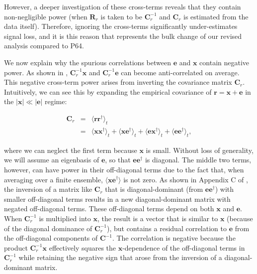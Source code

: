 \documentclass[preprint2,numberedappendix,tighten]{aastex6}  %
\begin{document}
However, a deeper investigation of these cross-terms reveals that they contain non-negligible power (when $\textbf{R}_{r}$
is taken to be $\textbf{C}_{r}^{-1}$ and $\textbf{C}_{r}$ is estimated from the data itself). Therefore, ignoring the cross-terms significantly under-estimates signal loss, and it is this reason that represents the bulk change of our revised analysis compared to P64. 

We now explain why the spurious correlations between $\textbf{e}$ and $\textbf{x}$ contain negative power.  As shown in \citet{switzer_et_al2015}, 
$\textbf{C}_{r}^{-1}\textbf{x}$ and
$\textbf{C}_{r}^{-1}\textbf{e}$
can become anti-correlated on average. 
This negative cross-term power arises from inverting the covariance matrix
$\textbf{C}_{r}$. 
Intuitively, we can see this by expanding the empirical covariance of $\textbf{r}=\textbf{x}+\textbf{e}$ in the
$|\textbf{x}|\ll|\textbf{e}|$ regime:

\begin{eqnarray}
\textbf{C}_{r} &=& \langle \textbf{rr}^{\dagger} \rangle_{t} \\
&=& \langle \textbf{xx}^{\dagger} \rangle_{t} + \langle \textbf{xe}^{\dagger} \rangle_{t} + \langle \textbf{ex}^{\dagger} \rangle_{t} + \langle 
\textbf{ee}^{\dagger} \rangle_{t},
\end{eqnarray}

\noindent where we can neglect the first term because $\textbf{x}$ is small.  Without loss of generality, we will assume
an eigenbasis of $\textbf{e}$, so that $\textbf{ee}^{\dagger}$ is diagonal.
The middle 
two terms, however, can have power in their off-diagonal terms due to the fact that, when averaging over a finite
ensemble, $\langle\textbf{xe}^\dagger\rangle$ is not zero.  As shown in Appendix C of \citet{parsons_et_al2014}, the
inversion of a matrix like $\textbf{C}_{r}$ that is diagonal-dominant (from $\textbf{ee}^{\dagger}$) with smaller
off-diagonal terms results in a new diagonal-dominant matrix with negated off-diagonal terms. These off-diagonal
terms depend on both $\textbf{x}$ and $\textbf{e}$. When $\textbf{C}^{-1}_{r}$ is multiplied into $\textbf{x}$,
the result is a vector that is similar to $\textbf{x}$ (because of the diagonal dominance of $\textbf{C}^{-1}_{r}$), but
contains a residual correlation to $\textbf{e}$ from the off-diagonal components of $\textbf{C}^{-1}$. The
correlation is negative because the product $\textbf{C}_r^{-1}\textbf{x}$ effectively squares the $\textbf{x}$-dependence
of the off-diagonal terms in $\textbf{C}^{-1}_{r}$ while retaining the negative sign that arose from the inversion
of a diagonal-dominant matrix.
\end{document}
